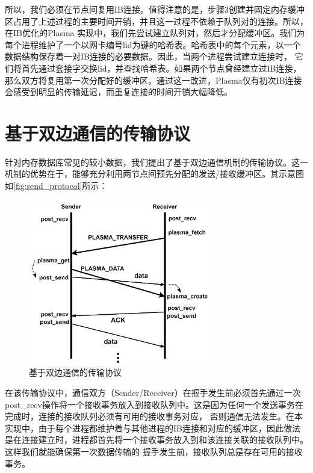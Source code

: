 所以，我们必须在节点间复用IB连接。值得注意的是，步骤3创建并固定内存缓冲区占用了上述过程的主要时间开销，并且这一过程不依赖于队列对的连接。所以，在IB优化的Plasma
实现中，我们先尝试建立队列对，然后才分配缓冲区。我们为每个进程维护了一个以网卡编号lid为键的哈希表。哈希表中的每个元素，以一个数据结构保存着一对IB连接的必要数据。因此，当两个进程尝试建立连接时，
它们将首先通过套接字交换lid，并查找哈希表。如果两个节点曾经建立过IB连接，那么双方将复用第一次分配好的缓冲区。通过这一改进，Plasma仅有初次IB连接会感受到明显的传输延迟，而重复连接的时间开销大幅降低。

\section{基于双边通信的传输协议}

针对内存数据库常见的较小数据，我们提出了基于双边通信机制的传输协议。这一机制的优势在于，能够充分利用两节点间预先分配的发送/接收缓冲区。其示意图如\autoref{fig:send_protocol}所示：

\begin{figure}[h]
	\centering
	\includegraphics[width=0.7\textwidth]{image/chap03/send_protocol.png}
	\caption{基于双边通信的传输协议}
	\label{fig:send_protocol}
\end{figure}

在该传输协议中，通信双方（Sender/Receiver）在握手发生前必须首先通过一次post\_recv操作将一个接收事务放入到接收队列中。这是因为任何一个发送事务在完成时，连接的接收队列必须有可用的接收事务对应，
否则通信无法发生。在本实现中，由于每个进程都维护着与其他进程的IB连接和对应的缓冲区，因此做法是在连接建立时，进程都首先将一个接收事务放入到和该连接关联的接收队列中。这样我们就能确保第一次数据传输的
握手发生前，接收队列总是存在可用的接收事务。

